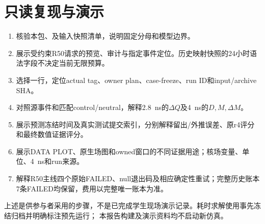 \section{只读复现与演示}
\begin{enumerate}
\item 核验本包、及输入快照清单，说明固定分母和模型边界。
\item 展示受约束R50请求的预览、审计与指定事件定位。历史映射快照的24小时语法字段不决定当前无限预算。
\item 选择一行，定位actual tag、owner plan、case-freeze、run ID和input/archive SHA。
\item 对照源事件和匹配control/neutral，解释2.8~ns的$\Delta Q$及4~ns的$D,M,\Delta M$。
\item 展示预测冻结时间及真实测试提交索引，分别解释留出/外推误差、原r4评分和最终数值证据评分。
\item 展示DATA PLOT、原生场图和owned窗口的不同证据用途；核场变量、单位、4~ns和run来源。
\item 解释R50主线四个原始FAILED、null退出码及相应确定性重试；完整历史账本7条FAILED均保留，费用以完整唯一账本为准。
\end{enumerate}
上述是供参与者采用的步骤，不是已完成学生现场演示记录。耗时求解使用事先冻结归档并明确标注预先运行；
本报告构建及演示资料均不启动新仿真。
\par\medskip\noindent

